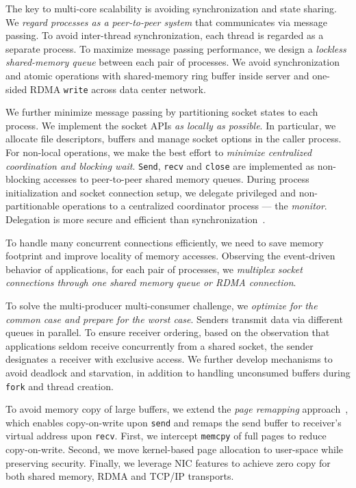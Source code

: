 The key to multi-core scalability is avoiding synchronization and state sharing. We \textit{regard processes as a peer-to-peer system} that communicates via message passing. To avoid inter-thread synchronization, each thread is regarded as a separate process. To maximize message passing performance, we design a \textit{lockless shared-memory queue} between each pair of processes. We avoid synchronization and atomic operations with shared-memory ring buffer inside server and one-sided RDMA \texttt{write} across data center network.

We further minimize message passing by partitioning socket states to each process. We implement the socket APIs \textit{as locally as possible}. In particular, we allocate file descriptors, buffers and manage socket options in the caller process. For non-local operations, we make the best effort to \textit{minimize centralized coordination and blocking wait}. \texttt{Send}, \texttt{recv} and \texttt{close} are implemented as non-blocking accesses to peer-to-peer shared memory queues. During process initialization and socket connection setup, we delegate privileged and non-partitionable operations to a centralized coordinator process --- the \textit{monitor}. Delegation is more secure and efficient than synchronization~\cite{roghanchi2017ffwd}.

To handle many concurrent connections efficiently, we need to save memory footprint and improve locality of memory accesses. Observing the event-driven behavior of applications, for each pair of processes, we \textit{multiplex socket connections through one shared memory queue or RDMA connection}. %

To solve the multi-producer multi-consumer challenge, we \textit{optimize for the common case and prepare for the worst case}. Senders transmit data via different queues in parallel. To ensure receiver ordering, based on the observation that applications seldom receive concurrently from a shared socket, the sender designates a receiver with exclusive access. We further develop mechanisms to avoid deadlock and starvation, in addition to handling unconsumed buffers during \texttt{fork} and thread creation.

To avoid memory copy of large buffers, we extend the \textit{page remapping} approach~\cite{thadani1995efficient,chu1996zero}, which enables copy-on-write upon \texttt{send} and remaps the send buffer to receiver's virtual address upon \texttt{recv}. First, we intercept \texttt{memcpy} of full pages to reduce copy-on-write. Second, we move kernel-based page allocation to user-space while preserving security. Finally, we leverage NIC features to achieve zero copy for both shared memory, RDMA and TCP/IP transports.

